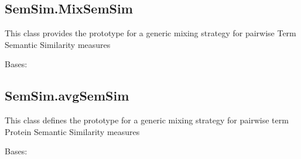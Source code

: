 \documentclass[letterpaper,10pt,english]{sphinxmanual}
\begin{document}
\subsection{SemSim.MixSemSim}
\label{fastsemsim.SemSim:semsim-mixsemsim}\label{fastsemsim.SemSim:module-fastsemsim.SemSim.MixSemSim}
This class provides the prototype for a generic mixing strategy for pairwise Term Semantic Similarity measures

\begin{fulllineitems}
\label{fastsemsim.SemSim:fastsemsim.SemSim.MixSemSim.MixSemSim}
Bases: 

\begin{fulllineitems}
\label{fastsemsim.SemSim:fastsemsim.SemSim.MixSemSim.MixSemSim.SemSim}
\end{fulllineitems}


\end{fulllineitems}



\subsection{SemSim.avgSemSim}
\label{fastsemsim.SemSim:module-fastsemsim.SemSim.avgSemSim}\label{fastsemsim.SemSim:semsim-avgsemsim}
This class defines the prototype for a generic mixing strategy for pairwise term Protein Semantic Similarity measures

\begin{fulllineitems}
\label{fastsemsim.SemSim:fastsemsim.SemSim.avgSemSim.avgSemSim}
Bases: {\hyperref[fastsemsim.SemSim:fastsemsim.SemSim.MixSemSim.MixSemSim]{}}

\end{fulllineitems}
\end{document}

